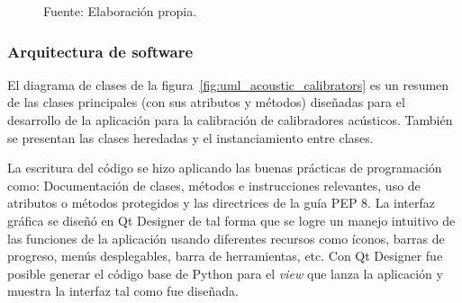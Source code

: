\begin{figure}[!hp]
    \caption*{\footnotesize Fuente: Elaboración propia.}
\end{figure}

\subsubsection{Arquitectura de software}
%
El diagrama de clases de la figura~\ref{fig:uml_acoustic_calibrators} es un resumen de las clases principales (con sus atributos y métodos) diseñadas para el desarrollo de la aplicación para la calibración de calibradores acústicos.
También se presentan las clases heredadas y el instanciamiento entre clases.

La escritura del código se hizo aplicando las buenas prácticas de programación como: Documentación de clases, métodos e instrucciones relevantes, uso de atributos o métodos protegidos y las directrices de la guía PEP 8.
La interfaz gráfica se diseñó en Qt Designer de tal forma que se logre un manejo intuitivo de las funciones de la aplicación usando diferentes recursos como íconos, barras de progreso, menús desplegables, barra de herramientas, etc.
Con Qt Designer fue posible generar el código base de Python para el \emph{view} que lanza la aplicación y muestra la interfaz tal como fue diseñada.

